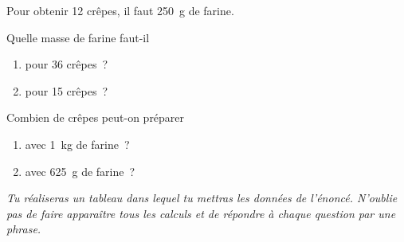 Pour obtenir 12 crêpes, il faut 250~g de farine.
\begin{myenumerate}
  \item Quelle masse de farine faut-il
    \begin{enumerate}
    \item pour 36 crêpes ?
    \item pour 15 crêpes ?
    \end{enumerate}
  \item Combien de crêpes peut-on préparer
    \begin{enumerate}
    \item avec 1~kg de farine ?
    \item avec 625~g de farine ?
    \end{enumerate}
\end{myenumerate}
{\em Tu réaliseras un tableau dans lequel tu mettras les données de l'énoncé. N'oublie pas de faire apparaître tous les calculs et de répondre à chaque question par une phrase.}